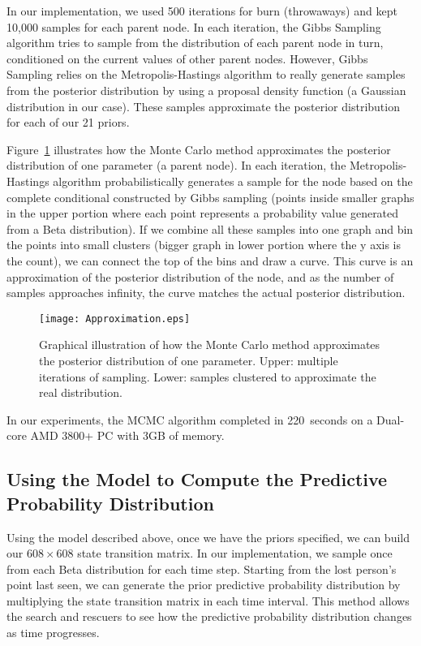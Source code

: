 In our implementation, we used 500 iterations for burn (throwaways) and kept 10,000 samples for each parent node. In each iteration, the Gibbs Sampling algorithm tries to sample from the distribution of each parent node in turn, conditioned on the current values of other parent nodes. However, Gibbs Sampling relies on the Metropolis-Hastings algorithm to really generate samples from the posterior distribution by using a proposal density function (a Gaussian distribution in our case). These samples approximate the posterior distribution for each of our 21 priors. 

Figure~\ref{Approximation} illustrates how the Monte Carlo method approximates the posterior distribution of one parameter (a parent node). In each iteration, the Metropolis-Hastings algorithm probabilistically generates a sample for the node based on the complete conditional constructed by Gibbs sampling (points inside smaller graphs in the upper portion where each point represents a probability value generated from a Beta distribution). If we combine all these samples into one graph and bin the points into small clusters (bigger graph in lower portion where the y axis is the count), we can connect the top of the bins and draw a curve. This curve is an approximation of the posterior distribution of the node, and as the number of samples approaches infinity, the curve matches the actual posterior distribution.

\begin{figure}
\centering
\texttt{[image: Approximation.eps]}
\caption{Graphical illustration of how the Monte Carlo method approximates the posterior distribution of one parameter. Upper: multiple iterations of sampling. Lower: samples clustered to approximate the real distribution.}
\label{Approximation}
\end{figure}

In our experiments, the MCMC algorithm completed in 220~seconds on a Dual-core AMD 3800+ PC with 3GB of memory.

\subsection{Using the Model to Compute the Predictive Probability Distribution}
\label{sec:3.6}

Using the model described above, once we have the priors specified, we can build our $608 \times 608$ state transition matrix. In our implementation, we sample once from each Beta distribution for each time step. Starting from the lost person's point last seen, we can generate the prior predictive probability distribution by multiplying the state transition matrix in each time interval. This method allows the search and rescuers to see how the predictive probability distribution changes as time progresses.


